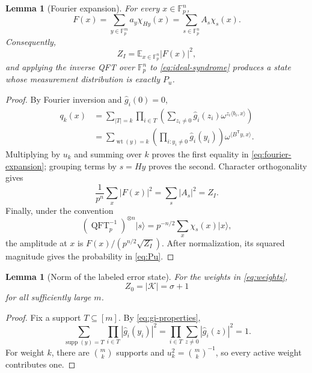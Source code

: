 \documentclass[10pt,a4paper]{amsart}
\newtheorem{lemma}[theorem]{Lemma}
\newcommand{\F}{\mathbb{F}}
\newcommand{\Kcal}{\mathcal{K}}
\newcommand{\supp}{\operatorname{supp}}
\newcommand{\wt}{\operatorname{wt}}
\newcommand{\E}{\mathbb{E}}
\newcommand{\ket}[1]{\lvert #1\rangle}
\newcommand{\abs}[1]{\left\lvert #1\right\rvert}
\newcommand{\QFT}{\operatorname{QFT}}
\begin{document}
\begin{lemma}[Fourier expansion]
\label{lem:fourier-expansion}
For every $x\in\F_p^n$,
\begin{equation}
   F(x)=\sum_{y\in\F_p^m}a_y\chi_{Hy}(x)
       =\sum_{s\in\F_p^n}A_s\chi_s(x).
   \label{eq:fourier-expansion}
\end{equation}
Consequently,
\begin{equation}
   Z_I=\E_{x\in\F_p^n}\abs{F(x)}^2,
   \label{eq:ZI-parseval}
\end{equation}
and applying the inverse QFT over $\F_p^n$ to \cref{eq:ideal-syndrome} produces a state whose measurement distribution is exactly $P_u$.
\end{lemma}

\begin{proof}
By Fourier inversion and $\widehat g_i(0)=0$,
\begin{align*}
   q_k(x)
   &=\sum_{\abs{T}=k}\prod_{i\in T}
       \left(\sum_{z_i\ne0}\widehat g_i(z_i)
       \omega^{z_i\langle b_i,x\rangle}\right)\\
   &=\sum_{\wt(y)=k}
       \left(\prod_{i:y_i\ne0}\widehat g_i(y_i)\right)
       \omega^{\langle B^{\mathsf T}y,x\rangle}.
\end{align*}
Multiplying by $u_k$ and summing over $k$ proves the first equality in \cref{eq:fourier-expansion}; grouping terms by $s=Hy$ proves the second.  Character orthogonality gives
\[
   \frac1{p^n}\sum_x\abs{F(x)}^2
   =\sum_s\abs{A_s}^2=Z_I.
\]
Finally, under the convention
\[
   (\QFT_p^{-1})^{\otimes n}\ket{s}
      =p^{-n/2}\sum_x\chi_s(x)\ket{x},
\]
the amplitude at $x$ is $F(x)/(p^{n/2}\sqrt{Z_I})$.  After normalization, its squared magnitude gives the probability in \cref{eq:Pu}.
\end{proof}

\begin{lemma}[Norm of the labeled error state]
\label{lem:Z0}
For the weights in \cref{eq:weights},
\begin{equation}
   Z_0=\abs{\Kcal}=\sigma+1
\end{equation}
for all sufficiently large $m$.
\end{lemma}

\begin{proof}
Fix a support $T\subseteq[m]$.  By \cref{eq:gi-properties},
\[
   \sum_{\supp(y)=T}
      \prod_{i\in T}\abs{\widehat g_i(y_i)}^2
   =\prod_{i\in T}\sum_{z\ne0}\abs{\widehat g_i(z)}^2=1.
\]
For weight $k$, there are $\binom mk$ supports and $u_k^2=\binom mk^{-1}$, so every active weight contributes one.
\end{proof}
\end{document}
